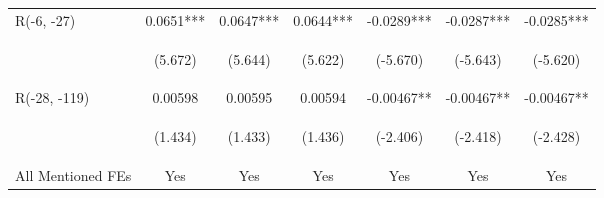 \documentclass[border=0.2cm]{standalone}
\begin{document}
\begin{tabular}{lcccccc}
    R(-6, -27)        & 0.0651***                                      & 0.0647***                                      & 0.0644***                                      & -0.0289***                                      & -0.0287***                                     & -0.0285***                                     \\
    \vspace{4pt}      & \begin{footnotesize}(5.672)\end{footnotesize}  & \begin{footnotesize}(5.644)\end{footnotesize}  & \begin{footnotesize}(5.622)\end{footnotesize}  & \begin{footnotesize}(-5.670)\end{footnotesize}  & \begin{footnotesize}(-5.643)\end{footnotesize} & \begin{footnotesize}(-5.620)\end{footnotesize} \\
    R(-28, -119)      & 0.00598                                        & 0.00595                                        & 0.00594                                        & -0.00467**                                      & -0.00467**                                     & -0.00467**                                     \\
    \vspace{4pt}      & \begin{footnotesize}(1.434)\end{footnotesize}  & \begin{footnotesize}(1.433)\end{footnotesize}  & \begin{footnotesize}(1.436)\end{footnotesize}  & \begin{footnotesize}(-2.406)\end{footnotesize}  & \begin{footnotesize}(-2.418)\end{footnotesize} & \begin{footnotesize}(-2.428)\end{footnotesize} \\
    All Mentioned FEs & Yes                                            & Yes                                            & Yes                                            & Yes                                             & Yes                                            & Yes                                            \\

\end{tabular}
\end{document}
